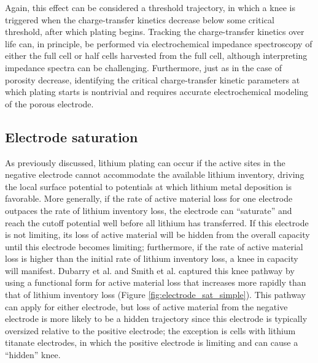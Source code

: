 \documentclass[journal=jpclcd,manuscript=article]{achemso}
\begin{document}
Again, this effect can be considered a threshold trajectory, in which a knee is triggered when the charge-transfer kinetics decrease below some critical threshold, after which plating begins.
Tracking the charge-transfer kinetics over life can, in principle, be performed via electrochemical impedance spectroscopy of either the full cell or half cells harvested from the full cell\cite{klett_non-uniform_2014, ecker_calendar_2014, schuster_nonlinear_2015}{}, although interpreting impedance spectra can be challenging.
Furthermore, just as in the case of porosity decrease, identifying the critical charge-transfer kinetic parameters at which plating starts is nontrivial and requires accurate electrochemical modeling of the porous electrode. 

\subsection{Electrode saturation}

As previously discussed, lithium plating can occur if the active sites in the negative electrode cannot accommodate the available lithium inventory, driving the local surface potential to potentials at which lithium metal deposition is favorable. More generally, if the rate of active material loss for one electrode outpaces the rate of lithium inventory loss, the electrode can ``saturate'' and reach the cutoff potential well before all lithium has transferred. If this electrode is not limiting, its loss of active material will be hidden from the overall capacity until this electrode becomes limiting; furthermore, if the rate of active material loss is higher than the initial rate of lithium inventory loss, a knee in capacity will manifest. Dubarry et al.\cite{dubarry_synthesize_2012} and Smith et al.\cite{smith_life_2017} captured this knee pathway by using a functional form for active material loss that increases more rapidly than that of lithium inventory loss (Figure \ref{fig:electrode_sat_simple}).
This pathway can apply for either electrode, but loss of active material from the negative electrode is more likely to be a hidden trajectory since this electrode is typically oversized relative to the positive electrode; the exception is cells with lithium titanate electrodes, in which the positive electrode is limiting and can cause a ``hidden'' knee\cite{baure_battery_2019, baure_battery_2020}.
\end{document}
